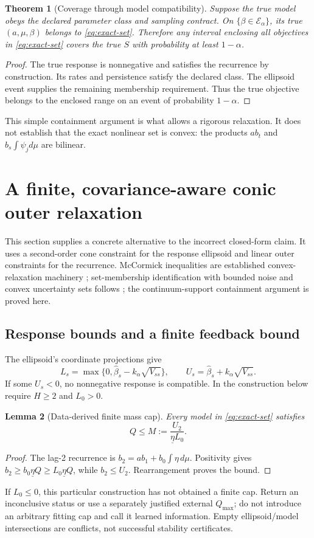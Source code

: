 \documentclass[11pt,a4paper]{article}
\newtheorem{theorem}{Theorem}[section]
\newtheorem{lemma}[theorem]{Lemma}
\theoremstyle{definition}\newtheorem{definition}[theorem]{Definition}
\theoremstyle{remark}\newtheorem{remark}[theorem]{Remark}
\newcommand{\mc}{\mathcal}
\begin{document}
\begin{theorem}[Coverage through model compatibility]\label{thm:compatibility}
Suppose the true model obeys the declared parameter class and sampling contract. On $\{\beta\in\mc E_\alpha\}$, its true $(a,\mu,\beta)$ belongs to \eqref{eq:exact-set}. Therefore any interval enclosing all objectives in \eqref{eq:exact-set} covers the true $S$ with probability at least $1-\alpha$.
\end{theorem}
\begin{proof}
The true response is nonnegative and satisfies the recurrence by construction. Its rates and persistence satisfy the declared class. The ellipsoid event supplies the remaining membership requirement. Thus the true objective belongs to the enclosed range on an event of probability $1-\alpha$.
\end{proof}
This simple containment argument is what allows a rigorous relaxation. It does not establish that the exact nonlinear set is convex: the products $ab_t$ and $b_s\int\psi_jd\mu$ are bilinear.

\section{A finite, covariance-aware conic outer relaxation}
This section supplies a concrete alternative to the incorrect closed-form claim. It uses a second-order cone constraint for the response ellipsoid and linear outer constraints for the recurrence. McCormick inequalities are established convex-relaxation machinery \cite{mccormick}; set-membership identification with bounded noise and convex uncertainty sets follows \cite{milanese1991,calafiore2005}; the continuum-support containment argument is proved here.

\subsection{Response bounds and a finite feedback bound}
The ellipsoid's coordinate projections give
\[
 L_s=\max\{0,\hat\beta_s-k_\alpha\sqrt{V_{ss}}\},\qquad
 U_s=\hat\beta_s+k_\alpha\sqrt{V_{ss}}.
\]
If some $U_s<0$, no nonnegative response is compatible. In the construction below require $H\ge2$ and $L_0>0$.

\begin{lemma}[Data-derived finite mass cap]\label{lem:mass}
Every model in \eqref{eq:exact-set} satisfies
\begin{equation}
 Q\le M:=\frac{U_2}{\underline\eta L_0}.
 \label{eq:mass}
\end{equation}
\end{lemma}
\begin{proof}
The lag-2 recurrence is
$b_2=ab_1+b_0\int\eta\,d\mu$. Positivity gives
$b_2\ge b_0\underline\eta Q\ge L_0\underline\eta Q$, while $b_2\le U_2$. Rearrangement proves the bound.
\end{proof}
If $L_0\le0$, this particular construction has not obtained a finite cap. Return an inconclusive status or use a separately justified external $Q_{\max}$; do not introduce an arbitrary fitting cap and call it learned information. Empty ellipsoid/model intersections are conflicts, not successful stability certificates.
\end{document}
